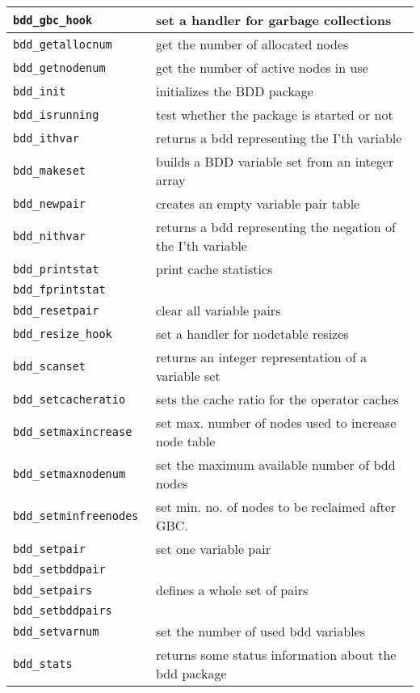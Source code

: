 \begin{supertabular}{|l|l|}
{\tt bdd\_gbc\_hook } & set a handler for garbage collections  \\\hline
{\tt bdd\_getallocnum } & get the number of allocated nodes  \\\hline
{\tt bdd\_getnodenum } & get the number of active nodes in use  \\\hline
{\tt bdd\_init } & initializes the BDD package  \\\hline
{\tt bdd\_isrunning } & test whether the package is started or not  \\\hline
{\tt bdd\_ithvar } & returns a bdd representing the I'th variable  \\\hline
{\tt bdd\_makeset } & builds a BDD variable set from an integer array  \\\hline
{\tt bdd\_newpair } & creates an empty variable pair table  \\\hline
{\tt bdd\_nithvar } & returns a bdd representing the negation of the I'th variable  \\\hline
{\tt bdd\_printstat } & print cache statistics  \\
{\tt bdd\_fprintstat } & \\\hline
{\tt bdd\_resetpair } & clear all variable pairs  \\\hline
{\tt bdd\_resize\_hook  } & set a handler for nodetable resizes  \\\hline
{\tt bdd\_scanset } & returns an integer representation of a variable set  \\\hline
{\tt bdd\_setcacheratio } & sets the cache ratio for the operator caches  \\\hline
{\tt bdd\_setmaxincrease } & set max. number of nodes used to increase node table  \\\hline
{\tt bdd\_setmaxnodenum } & set the maximum available number of bdd nodes  \\\hline
{\tt bdd\_setminfreenodes } & set min. no. of nodes to be reclaimed after GBC.  \\\hline
{\tt bdd\_setpair } & set one variable pair  \\
{\tt bdd\_setbddpair } & \\\hline
{\tt bdd\_setpairs } & defines a whole set of pairs  \\
{\tt bdd\_setbddpairs } & \\\hline
{\tt bdd\_setvarnum } & set the number of used bdd variables  \\\hline
{\tt bdd\_stats } & returns some status information about the bdd package  \\\hline

\end{supertabular}
